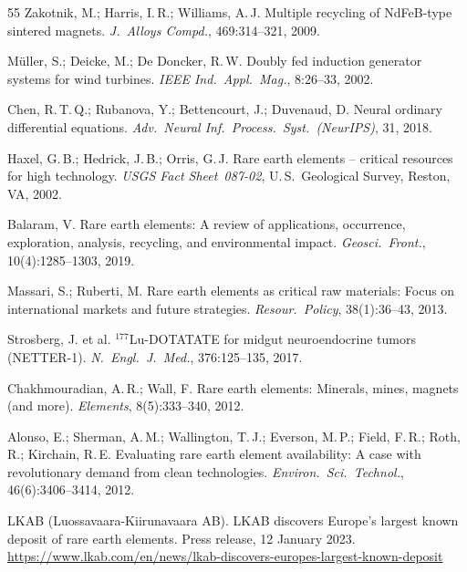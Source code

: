 ﻿\documentclass[12pt, a4paper]{report}
\theoremstyle{definition}
\theoremstyle{remark}
\begin{document}
\begin{thebibliography}{55}
  Zakotnik, M.; Harris, I.\,R.; Williams, A.\,J.
  Multiple recycling of NdFeB-type sintered magnets.
  \textit{J.\ Alloys Compd.}, 469:314--321, 2009.

  M\"uller, S.; Deicke, M.; De Doncker, R.\,W.
  Doubly fed induction generator systems for wind turbines.
  \textit{IEEE Ind.\ Appl.\ Mag.}, 8:26--33, 2002.

  Chen, R.\,T.\,Q.; Rubanova, Y.; Bettencourt, J.; Duvenaud, D.
  Neural ordinary differential equations.
  \textit{Adv.\ Neural Inf.\ Process.\ Syst.\ (NeurIPS)}, 31, 2018.


  Haxel, G.\,B.; Hedrick, J.\,B.; Orris, G.\,J.
  Rare earth elements -- critical resources for high technology.
  \textit{USGS Fact Sheet~087-02}, U.\,S.\ Geological Survey, Reston, VA, 2002.

  Balaram, V.
  Rare earth elements: A review of applications, occurrence, exploration,
  analysis, recycling, and environmental impact.
  \textit{Geosci.\ Front.}, 10(4):1285--1303, 2019.

  Massari, S.; Ruberti, M.
  Rare earth elements as critical raw materials: Focus on international markets
  and future strategies.
  \textit{Resour.\ Policy}, 38(1):36--43, 2013.

  Strosberg, J. et al.
  $^{177}$Lu-DOTATATE for midgut neuroendocrine tumors (NETTER-1).
  \textit{N.\ Engl.\ J.\ Med.}, 376:125--135, 2017.

  Chakhmouradian, A.\,R.; Wall, F.
  Rare earth elements: Minerals, mines, magnets (and more).
  \textit{Elements}, 8(5):333--340, 2012.

  Alonso, E.; Sherman, A.\,M.; Wallington, T.\,J.; Everson, M.\,P.;
  Field, F.\,R.; Roth, R.; Kirchain, R.\,E.
  Evaluating rare earth element availability: A case with revolutionary
  demand from clean technologies.
  \textit{Environ.\ Sci.\ Technol.}, 46(6):3406--3414, 2012.

  LKAB (Luossavaara-Kiirunavaara AB).
  LKAB discovers Europe's largest known deposit of rare earth elements.
  Press release, 12 January 2023.
  {\small\url{https://www.lkab.com/en/news/lkab-discovers-europes-largest-known-deposit}}


\end{thebibliography}
\end{document}
